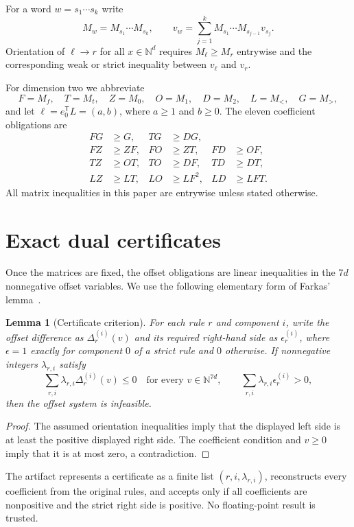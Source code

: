 \documentclass[11pt]{article}
\newtheorem{lemma}[theorem]{Lemma}
\theoremstyle{definition}
\newcommand{\N}{\mathbb{N}}
\begin{document}
For a word $w=s_1\cdots s_k$ write
\[
 M_w=M_{s_1}\cdots M_{s_k},\qquad
 v_w=\sum_{j=1}^{k}M_{s_1}\cdots M_{s_{j-1}}v_{s_j}.
\]
Orientation of $\ell\to r$ for all $x\in\N^d$ requires
$M_\ell\ge M_r$ entrywise and the corresponding weak or strict inequality
between $v_\ell$ and $v_r$.

For dimension two we abbreviate
\[
 F=M_f,\quad T=M_t,\quad Z=M_0,\quad O=M_1,\quad D=M_2,
 \quad L=M_<,\quad G=M_>,
\]
and let $\ell=e_0^{\mathsf T}L=(a,b)$, where $a\ge1$ and $b\ge0$.
The eleven coefficient obligations are
\begin{align}
 FG&\ge G, & TG&\ge DG,\label{eq:dyncoeff}\\
 FZ&\ge ZF, & FO&\ge ZT, & FD&\ge OF,\label{eq:fcarry}\\
 TZ&\ge OT, & TO&\ge DF, & TD&\ge DT,\label{eq:tcarry}\\
 LZ&\ge LT, & LO&\ge LF^2, & LD&\ge LFT.\label{eq:leftcoeff}
\end{align}
All matrix inequalities in this paper are entrywise unless stated otherwise.

\section{Exact dual certificates}

Once the matrices are fixed, the offset obligations are linear inequalities
in the $7d$ nonnegative offset variables.  We use the following elementary
form of Farkas' lemma~\cite{schrijver}.

\begin{lemma}[Certificate criterion]\label{lem:farkas}
For each rule $r$ and component $i$, write the offset difference as
$\Delta_r^{(i)}(v)$ and its required right-hand side as
$\epsilon_r^{(i)}$, where $\epsilon=1$ exactly for component $0$ of a
strict rule and $0$ otherwise.  If nonnegative integers
$\lambda_{r,i}$ satisfy
\[
  \sum_{r,i}\lambda_{r,i}\Delta_r^{(i)}(v)\le0
  \quad\text{for every }v\in\N^{7d},
  \qquad
  \sum_{r,i}\lambda_{r,i}\epsilon_r^{(i)}>0,
\]
then the offset system is infeasible.
\end{lemma}

\begin{proof}
The assumed orientation inequalities imply that the displayed left side is
at least the positive displayed right side.  The coefficient condition and
$v\ge0$ imply that it is at most zero, a contradiction.
\end{proof}

The artifact represents a certificate as a finite list
$(r,i,\lambda_{r,i})$, reconstructs every coefficient from the original
rules, and accepts only if all coefficients are nonpositive and the strict
right side is positive.  No floating-point result is trusted.
\end{document}
